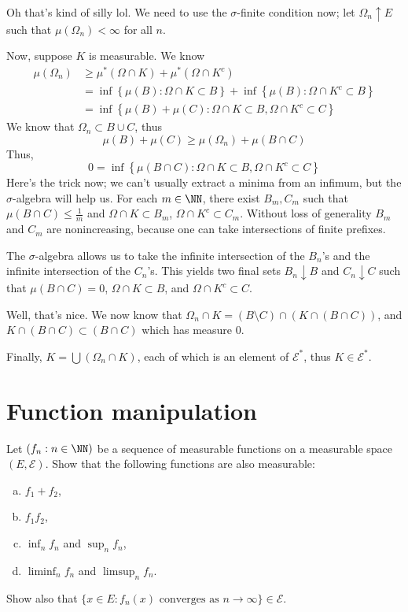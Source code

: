 \documentclass[11pt, headheight=30pt]{scrartcl}
\begin{document}
\begin{psec*}
    Oh that's kind of silly lol. We need to use the $\sigma$-finite condition
    now; let $\Omega_n\uparrow E$ such that $\mu(\Omega_n) < \infty$ for all $n$.

    Now, suppose $K$ is measurable. We know
    \begin{align*}
        \mu(\Omega_n) &\geq \mu^*(\Omega\cap K)  + \mu^*(\Omega \cap K^c)\\
        &= \inf\left\{\mu(B): \Omega\cap K\subset B\right\} + \inf\left\{\mu(B): \Omega\cap K^c\subset B\right\}\\
        &= \inf\left\{\mu(B) + \mu(C): \Omega\cap K\subset B, \Omega\cap K^c\subset C\right\}
    \end{align*}
    We know that $\Omega_n\subset B\cup C$, thus
    \[
        \mu(B) + \mu(C) \geq \mu(\Omega_n) + \mu(B\cap C)    
    \]
    Thus,
    \[
        0 = \inf\left\{\mu(B\cap C): \Omega\cap K\subset B, \Omega\cap K^c\subset C\right\}
    \]
    Here's the trick now; we can't usually extract a minima from an
    infimum, but the $\sigma$-algebra will help us. For each $m\in \NN$,
    there exist $B_m, C_m$ such that $\mu(B\cap C)\leq \frac{1}{m}$
    and $\Omega\cap K\subset B_m$, $\Omega\cap K^c\subset C_m$.
    Without loss of generality $B_m$ and $C_m$ are nonincreasing,
    because one can take intersections of finite prefixes.

    The $\sigma$-algebra allows us to take the infinite intersection
    of the $B_n$'s and the infinite intersection of the $C_n$'s.
    This yields two final sets $B_n\downarrow B$ and $C_n\downarrow C$
    such that $\mu(B\cap C) = 0$, $\Omega\cap K\subset B$, and $\Omega\cap K^c\subset C$.

    Well, that's nice. We now know that $\Omega_n \cap K = (B\setminus C)\cap (K\cap (B\cap C))$,
    and $K\cap (B\cap C)\subset (B\cap C)$ which has measure $0$.

    Finally, $K = \bigcup \left(\Omega_n \cap K\right)$, each of which is an element of
    $\mathcal{E}^*$, thus $K\in \mathcal{E}^*$.
\end{psec*}
\pagebreak
\section{Function manipulation}

\begin{prob*}[Preliminaries]
    Let $(f_n: n \in \NN)$ be a sequence of measurable functions on a measurable
    space $(E, \mathcal{E})$. Show that the following functions are also measurable:
    \begin{enumerate}[(a)]
        \item $f_1 + f_2$,
        \item $f_1 f_2$,
        \item $\inf_n f_n$ and $\sup_n f_n$,
        \item $\liminf_n f_n$ and $\limsup_n f_n$.
    \end{enumerate}
    Show also that $\{x \in E : f_n(x) \text{ converges as } n \to \infty\} \in \mathcal{E}$.
\end{prob*}
\end{document}
